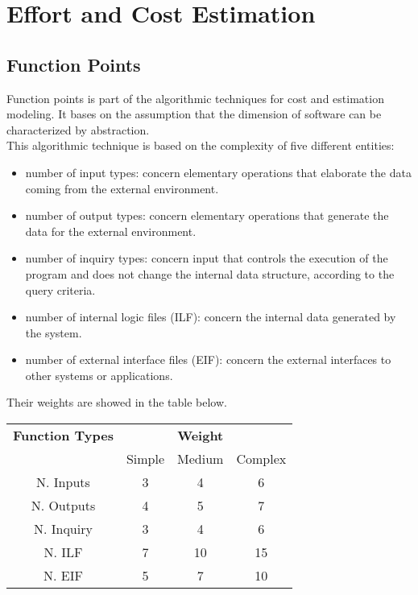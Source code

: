 \newpage
\section{Effort and Cost Estimation}

	\subsection{Function Points}
		Function points is part of the algorithmic techniques for cost and estimation modeling. It bases on the assumption that the dimension of software can be characterized by abstraction.\\
		This algorithmic technique is based on the complexity of five different entities: 
		\begin{itemize}
			\item number of input types: concern elementary operations that elaborate the data coming from the external environment.
			\item number of output types: concern elementary operations that generate the data for the external environment.
			\item number of inquiry types: concern input that controls the execution of the program and does not change the internal data structure, according to the query criteria.
			\item number of internal logic files (ILF): concern the internal data generated by the system.
			\item number of external interface files (EIF): concern the external interfaces to other systems or applications.
		\end{itemize}
		Their weights are showed in the table below.
		\vspace{0.9cm}
		\begin{center}
			\begin{tabular}{c c c c}
				\hline 	\textbf{Function Types} & & \textbf{Weight}  & \\[0.1cm]
				& Simple & Medium & Complex\\[0.1cm]
				\hline	N. Inputs & 3 & 4 & 6 \\[0.05cm]
				\hline	N. Outputs & 4 & 5 & 7 \\[0.05cm]
				\hline	N. Inquiry & 3 & 4 & 6 \\[0.05cm]
				\hline	N. ILF & 7 & 10 & 15 \\[0.05cm]
				\hline	N. EIF & 5 & 7 & 10 \\[0.05cm]
				\hline
			\end{tabular}
		\end{center}
		\newpage
